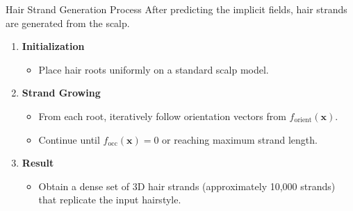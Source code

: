 \begin{frame}[t]{Hair Strand Generation Process}
    After predicting the implicit fields, hair strands are generated from the scalp.

    \vspace{5pt}

    \begin{enumerate}
        \item \textbf{Initialization}
        \begin{itemize}
            \item Place hair roots uniformly on a standard scalp model.
        \end{itemize}
        \item \textbf{Strand Growing}
        \begin{itemize}
            \item From each root, iteratively follow orientation vectors from $f_{\text{orient}}(\mathbf{x})$.
            \item Continue until $f_{\text{occ}}(\mathbf{x}) = 0$ or reaching maximum strand length.
        \end{itemize}
        \item \textbf{Result}
        \begin{itemize}
            \item Obtain a dense set of 3D hair strands (approximately 10,000 strands) that replicate the input hairstyle.
        \end{itemize}
    \end{enumerate}
\end{frame}
